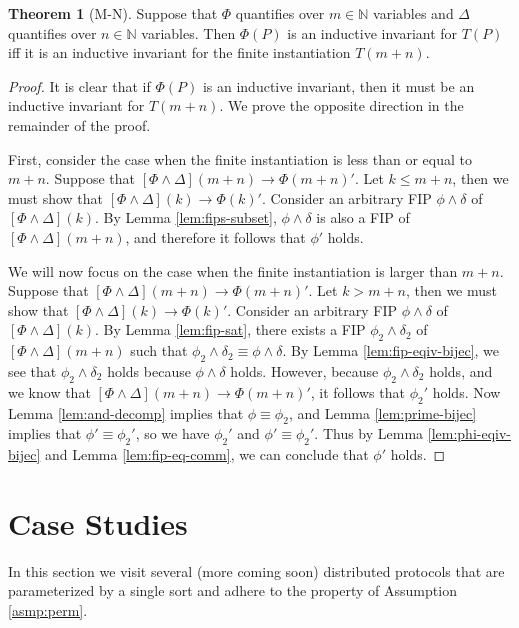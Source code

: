 \documentclass[12pt]{article}
\theoremstyle{definition}
\newtheorem{theorem}{Theorem}
\theoremstyle{remark}
\begin{document}
\begin{theorem}[M-N]
  Suppose that $\Phi$ quantifies over $m \in \mathbb{N}$ variables and $\Delta$ quantifies over $n \in \mathbb{N}$ variables.  Then $\Phi(P)$ is an inductive invariant for $T(P)$ iff it is an inductive invariant for the finite instantiation $T(m+n)$.
\end{theorem}
\begin{proof}
  It is clear that if $\Phi(P)$ is an inductive invariant, then it must be an inductive invariant for $T(m+n)$.  We prove the opposite direction in the remainder of the proof.

  First, consider the case when the finite instantiation is less than or equal to $m+n$.  Suppose that $[\Phi\land\Delta](m+n) \rightarrow \Phi(m+n)'$.  Let $k \leq m+n$, then we must show that $[\Phi\land\Delta](k) \rightarrow \Phi(k)'$.  Consider an arbitrary FIP $\phi\land\delta$ of $[\Phi\land\Delta](k)$.  By Lemma \ref{lem:fips-subset}, $\phi\land\delta$ is also a FIP of $[\Phi\land\Delta](m+n)$, and therefore it follows that $\phi'$ holds.

  We will now focus on the case when the finite instantiation is larger than $m+n$.  Suppose that $[\Phi\land\Delta](m+n) \rightarrow \Phi(m+n)'$.  Let $k > m+n$, then we must show that $[\Phi\land\Delta](k) \rightarrow \Phi(k)'$.  Consider an arbitrary FIP $\phi\land\delta$ of $[\Phi\land\Delta](k)$.  By Lemma \ref{lem:fip-sat}, there exists a FIP $\phi_2\land\delta_2$ of $[\Phi\land\Delta](m+n)$ such that $\phi_2\land\delta_2 \equiv \phi\land\delta$.  By Lemma \ref{lem:fip-eqiv-bijec}, we see that $\phi_2\land\delta_2$ holds because $\phi\land\delta$ holds.  However, because $\phi_2\land\delta_2$ holds, and we know that $[\Phi\land\Delta](m+n) \rightarrow \Phi(m+n)'$, it follows that $\phi_2'$ holds.  Now Lemma \ref{lem:and-decomp} implies that $\phi \equiv \phi_2$, and Lemma \ref{lem:prime-bijec} implies that $\phi' \equiv \phi_2'$, so we have $\phi_2'$ and $\phi' \equiv \phi_2'$.  Thus by Lemma \ref{lem:phi-eqiv-bijec} and Lemma \ref{lem:fip-eq-comm}, we can conclude that $\phi'$ holds.
\end{proof}


\section{Case Studies}
In this section we visit several (more coming soon) distributed protocols that are parameterized by a single sort and adhere to the property of Assumption \ref{asmp:perm}.
\end{document}
